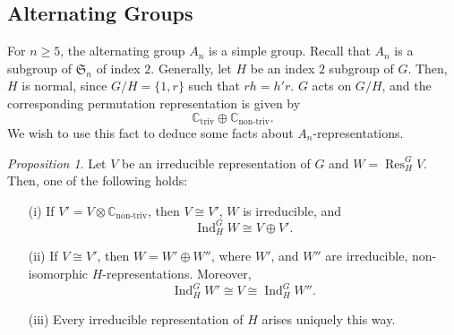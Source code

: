 \documentclass[a4paper]{report}
\theoremstyle{definition}
\theoremstyle{remark}
\theoremstyle{proposition}
\newtheorem{proposition}{Proposition}
\theoremstyle{conjecture}
\theoremstyle{lemma}
\theoremstyle{corollary}
\theoremstyle{exercise}
\theoremstyle{example}
\newcommand{\C}{\mathbb{C}}
\newcommand{\on}{\operatorname}
\begin{document}
\subsection{Alternating Groups}

For $n\geq 5$, the alternating group $A_n$ is a simple group.
Recall that $A_n$ is a subgroup of $\mathfrak{S}_n$ of index $2$.
Generally, let $H$ be an index $2$ subgroup of $G$. Then, $H$ is normal, 
since $G/H = \lbrace 1,r\rbrace$ such that $rh = h'r$.
$G$ acts on $G/H$, and the corresponding permutation representation
is given by 
$$\C_{\on{triv}} \oplus \C_{\on{non-triv}}.$$
We wish to use this fact to deduce some facts about $A_n$-representations.

\begin{proposition}\label{prop19}
    Let $V$ be an irreducible representation of $G$ and 
    $W = \on{Res}_H^GV$. Then, one of the following holds:
    \begin{itemize}
        \item[(i)] If $V' = V \otimes \C_{\on{non-triv}}$,
            then $V\cong V'$, $W$ is irreducible, and 
            $$\on{Ind}_H^GW \cong V\oplus V'.$$
        \item[(ii)] If $V\cong V'$, then 
            $W = W'\oplus W''$, where $W'$, and $W''$ are 
            irreducible, non-isomorphic $H$-representations.
            Moreover,
            $$\on{Ind}_H^GW' \cong V \cong \on{Ind}_H^GW''.$$
        \item[(iii)] Every irreducible representation of $H$ 
            arises uniquely this way.
    \end{itemize}
\end{proposition}
\end{document}
